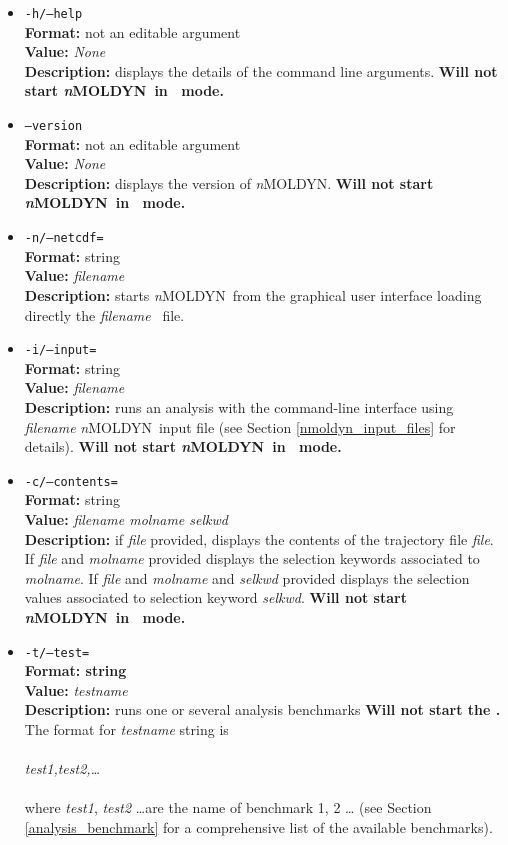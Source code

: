 \documentclass[a4paper,11pt]{report}
\newcommand{\NMOLDYN}{\textit{n}MOLDYN}
\begin{document}
\begin{itemize}
\item{\texttt {-h/--help}}\\
\textbf{Format:} not an editable argument\\
\textbf{Value:} \textit{None}\\
\textbf{Description:} displays the details of the command line arguments. \textbf{Will not start \NMOLDYN\ in \GUI\ mode.}

\item{\texttt {--version}}\\
\textbf{Format:} not an editable argument\\
\textbf{Value:} \textit{None}\\
\textbf{Description:} displays the version of \NMOLDYN . \textbf{Will not start \NMOLDYN\ in \GUI\ mode.}

\item{\texttt {-n/--netcdf=}}\\
\textbf{Format:} string\\
\textbf{Value:} \textit{filename}\\
\textbf{Description:} starts \NMOLDYN\ from the graphical user interface loading directly the \textit{filename} \NetCDF\ file.

\item{\texttt {-i/--input=}}\\
\textbf{Format:} string\\
\textbf{Value:} \textit{filename}\\
\textbf{Description:} runs an analysis with the command-line interface using \textit{filename} \NMOLDYN\ input file (see 
Section \ref{nmoldyn_input_files} for details). \textbf{Will not start \NMOLDYN\ in \GUI\ mode.}

\item{\texttt {-c/--contents=}}\\
\textbf{Format:} string\\
\textbf{Value:} \textit{filename molname selkwd}\\
\textbf{Description:} if \textit{file} provided, displays the contents of the trajectory file \textit{file}. If 
\textit{file} and \textit{molname} provided displays the selection keywords associated to \textit{molname}. If 
\textit{file} and \textit{molname} and \textit{selkwd} provided displays the selection values associated to selection 
keyword \textit{selkwd}. \textbf{Will not start \NMOLDYN\ in \GUI\ mode.}

\item{\texttt {-t/--test=}}\\
\textbf{Format: string} \\
\textbf{Value:} \textit{testname}\\
\textbf{Description:} runs one or several analysis benchmarks  \textbf{Will not start the \GUI .} The format for 
\textit{testname} string is
\\\\
\textit{test1,test2,\ldots }
\\\\
where \textit{test1}, \textit{test2} \ldots are the name of benchmark 1, 2 \ldots 
(see Section \ref{analysis_benchmark} for a comprehensive list of the available benchmarks).


\end{itemize}
\end{document}
